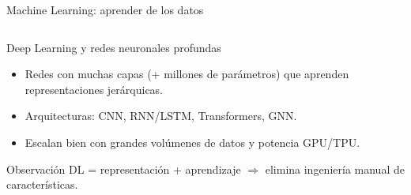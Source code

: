 \documentclass[8pt,spanish]{beamer}
\begin{document}
\begin{frame}[fragile]{Machine Learning: aprender de los datos}
\begin{columns}[T]
\begin{column}{0.53\textwidth}
  \begin{center}

    \vspace{1.1em}
  \end{center}
\end{column}
\end{columns}
\end{frame}


\begin{frame}{Deep Learning y redes neuronales profundas}
  \begin{itemize}
    \item Redes con muchas capas (+ millones de parámetros) que aprenden
          representaciones jerárquicas.
    \item Arquitecturas: CNN, RNN/LSTM, Transformers, GNN.
    \item Escalan bien con grandes volúmenes de datos y potencia GPU/TPU.
  \end{itemize}
  \begin{block}{Observación}
    DL = representación + aprendizaje \(\Rightarrow\) elimina ingeniería manual de características.
  \end{block}
\end{frame}
\end{document}
